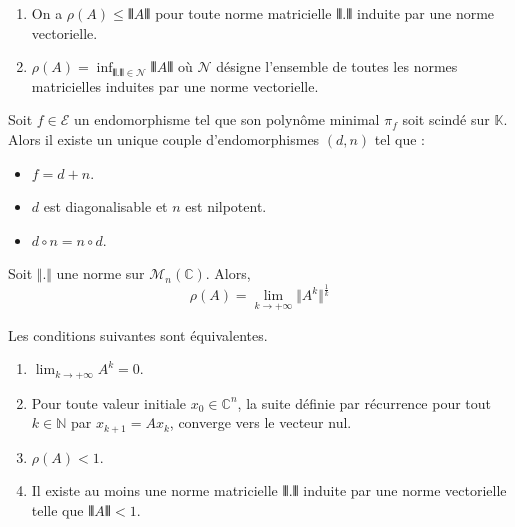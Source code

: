   \begin{theorem}
    \begin{enumerate}[label=(\roman*)]
      \item On a $\rho(A) \leq \VERT A \VERT$ pour toute norme matricielle $\VERT . \VERT$ induite par une norme vectorielle.
      \item $\rho(A) = \inf_{\VERT . \VERT \in \mathcal{N}} \VERT A \VERT$ où $\mathcal{N}$ désigne l'ensemble de toutes les normes matricielles induites par une norme vectorielle.
    \end{enumerate}
  \end{theorem}
  
  
  \begin{theorem}
    Soit $f \in \mathcal{E}$ un endomorphisme tel que son polynôme minimal $\pi_f$ soit scindé sur $\mathbb{K}$. Alors il existe un unique couple d'endomorphismes $(d, n)$ tel que :
    \begin{itemize}
      \item $f = d + n$.
      \item $d$ est diagonalisable et $n$ est nilpotent.
      \item $d \circ n = n \circ d$.
    \end{itemize}
  \end{theorem}
  
  
  \begin{corollary}
    Soit $\Vert . \Vert$ une norme sur $\mathcal{M}_n(\mathbb{C})$. Alors,
    \[ \rho(A) = \lim_{k \rightarrow +\infty} \Vert A^k \Vert^{\frac{1}{k}} \]
  \end{corollary}
  
  \begin{proposition}
    Les conditions suivantes sont équivalentes.
    \begin{enumerate}[label=(\roman*)]
      \item $\lim_{k \rightarrow +\infty} A^k = 0$.
      \item Pour toute valeur initiale $x_0 \in \mathbb{C}^n$, la suite définie par récurrence pour tout $k \in \mathbb{N}$ par $x_{k+1} = A x_k$, converge vers le vecteur nul.
      \item $\rho(A) < 1$.
      \item Il existe au moins une norme matricielle $\VERT . \VERT$ induite par une norme vectorielle telle que $\VERT A \VERT < 1$.
    \end{enumerate}
  \end{proposition}
  
